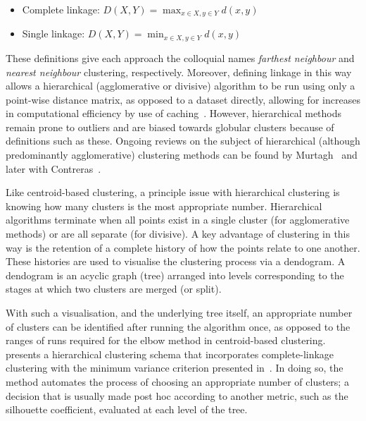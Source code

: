 \begin{itemize}
    \item Complete linkage: \(D(X, Y) = \max_{x \in X, y \in Y} d(x, y)\)
    \item Single linkage: \(D(X, Y) = \min_{x \in X, y \in Y} d(x, y)\)
\end{itemize}

These definitions give each approach the colloquial names \emph{farthest
neighbour} and \emph{nearest neighbour} clustering, respectively. Moreover,
defining linkage in this way allows a hierarchical (agglomerative or divisive)
algorithm to be run using only a point-wise distance matrix, as opposed to a
dataset directly, allowing for increases in computational efficiency by use of
caching~\cite{Nielsen2016}. However, hierarchical methods remain prone to
outliers and are biased towards globular clusters because of definitions such as
these. Ongoing reviews on the subject of hierarchical (although predominantly
agglomerative) clustering methods can be found by Murtagh~\cite{Murtagh1983} and
later with Contreras~\cite{Murtagh2012,Murtagh2017}.

Like centroid-based clustering, a principle issue with hierarchical clustering
is knowing how many clusters is the most appropriate number. Hierarchical
algorithms terminate when all points exist in a single cluster (for
agglomerative methods) or are all separate (for divisive). A key advantage of
clustering in this way is the retention of a complete history of how the points
relate to one another. These histories are used to visualise the clustering
process via a dendogram. A dendogram is an acyclic graph (tree) arranged into
levels corresponding to the stages at which two clusters are merged (or split).

With such a visualisation, and the underlying tree itself, an appropriate number
of clusters can be identified after running the algorithm once, as opposed to
the ranges of runs required for the elbow method in centroid-based
clustering.~\cite{Tellaroli2016} presents a hierarchical clustering schema that
incorporates complete-linkage clustering with the minimum variance criterion
presented in~\cite{Ward1963}. In doing so, the method automates the process of
choosing an appropriate number of clusters; a decision that is usually made post
hoc according to another metric, such as the silhouette coefficient, evaluated
at each level of the tree.


